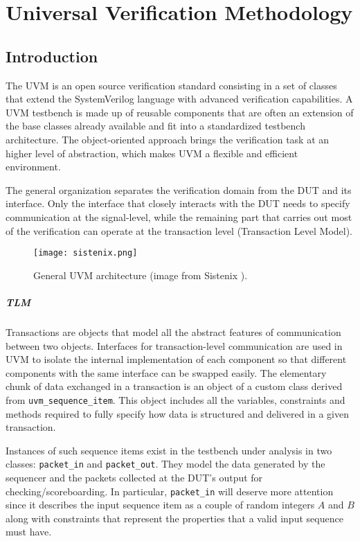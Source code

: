 \chapter{Universal Verification Methodology}
\section{Introduction}
The UVM is an open source verification standard consisting in a set of classes that extend the SystemVerilog language with advanced verification capabilities. A UVM testbench is made up of reusable components that are often an extension of the base classes already available and fit into a standardized testbench architecture. The object-oriented approach brings the verification task at an higher level of abstraction, which makes UVM a flexible and efficient environment.

The general organization separates the verification domain from the DUT and its interface. Only the interface that closely interacts with the DUT needs to specify communication at the signal-level, while the remaining part that carries out most of the verification can operate at the transaction level (Transaction Level Model).
\begin{figure}[h]
	\centering
	\texttt{[image: sistenix.png]}
	\caption{General UVM architecture (image from Sistenix \cite{sistenix}).}
	\label{fig:uvm}
\end{figure}

\paragraph{TLM} Transactions are objects that model all the abstract features of communication between two objects. Interfaces for transaction-level communication are used in UVM to isolate the internal implementation of each component so that different components with the same interface can be swapped easily.
The elementary chunk of data exchanged in a transaction is an object of a custom class derived from \texttt{uvm\_sequence\_item}. This object includes all the variables, constraints and methods required to fully specify how data is structured and delivered in a given transaction.

Instances of such sequence items exist in the testbench under analysis in two classes: \texttt{packet\_in} and \texttt{packet\_out}. They model the data generated by the sequencer and the packets collected at the DUT's output for checking/scoreboarding. In particular, \texttt{packet\_in} will deserve more attention since it describes the input sequence item as a couple of random integers $A$ and $B$ along with constraints that represent the properties that a valid input sequence must have.

